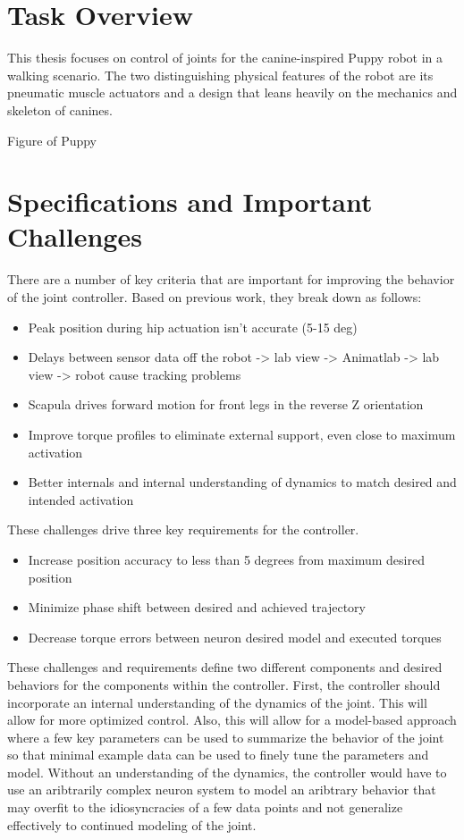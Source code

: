 \section{Task Overview}

This thesis focuses on control of joints for the canine-inspired
Puppy robot in a walking scenario. The two distinguishing physical features of 
the robot are its pneumatic muscle actuators and a design that leans heavily
on the mechanics and skeleton of canines.

Figure of Puppy

\section{Specifications and Important Challenges}

There are a number of key criteria that are important for improving the behavior
of the joint controller. Based on previous work, they break down as follows:

\begin{itemize}
\item Peak position during hip actuation isn't accurate (5-15 deg) 
\item Delays between sensor data off the robot -> lab view -> Animatlab -> lab
view -> robot cause tracking problems
\item Scapula drives forward motion for front legs in the reverse Z orientation
\item Improve torque profiles to eliminate external support, even close to
maximum activation
\item Better internals and internal understanding of dynamics to match desired
and intended activation
\end{itemize}

These challenges drive three key requirements for the controller.
\begin{itemize}
\item Increase position accuracy to less than 5 degrees from maximum desired
position
\item Minimize phase shift between desired and achieved trajectory
\item Decrease torque errors between neuron desired model and executed torques
\end{itemize}

These challenges and requirements define two different components and desired
behaviors for the components within the controller. First, the controller should
incorporate an internal understanding of the dynamics of the joint. This will
allow for more optimized control. Also, this will allow for a model-based
approach where a few key parameters can be used to summarize the behavior of the
joint so that minimal example data can be used to finely tune the parameters and
model. Without an understanding of the dynamics, the controller would have to
use an aribtrarily complex neuron system to model an aribtrary behavior that may
overfit to the idiosyncracies of a few data points and not generalize
effectively to continued modeling of the joint.

